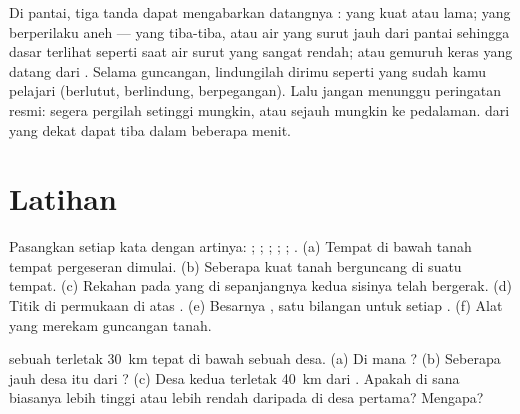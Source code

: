 \begin{remark}\label{rem:g7:earthquakes:natural-warning}
Di pantai, tiga tanda dapat mengabarkan datangnya :  yang
kuat atau lama;  yang berperilaku aneh ---  yang tiba-tiba, atau
air yang surut jauh dari pantai sehingga dasar  terlihat seperti saat
air surut yang sangat rendah; atau gemuruh keras yang datang dari .
Selama guncangan, lindungilah dirimu seperti yang sudah kamu pelajari
(berlutut, berlindung, berpegangan). Lalu jangan menunggu peringatan resmi:
segera pergilah setinggi mungkin, atau sejauh mungkin ke pedalaman.
 dari  yang dekat dapat tiba dalam beberapa menit.
\end{remark}


\section{Latihan}

\begin{exercise}[$\star$]\label{exo:g7:earthquakes:1}
Pasangkan setiap kata dengan artinya: ; ; ;
; ; . (a) Tempat di bawah tanah tempat
pergeseran dimulai. (b) Seberapa kuat tanah berguncang di suatu tempat.
(c) Rekahan pada  yang di sepanjangnya kedua sisinya telah bergerak.
(d) Titik di permukaan di atas . (e) Besarnya , satu
bilangan untuk setiap . (f) Alat yang merekam guncangan tanah.
\end{exercise}

\begin{exercise}[$\star$]\label{exo:g7:earthquakes:2}
 sebuah  terletak \qty{30}{km} tepat di bawah sebuah
desa. (a) Di mana ? (b) Seberapa jauh desa itu dari
? (c) Desa kedua terletak \qty{40}{km} dari . Apakah
 di sana biasanya lebih tinggi atau lebih rendah daripada di
desa pertama? Mengapa?
\end{exercise}

